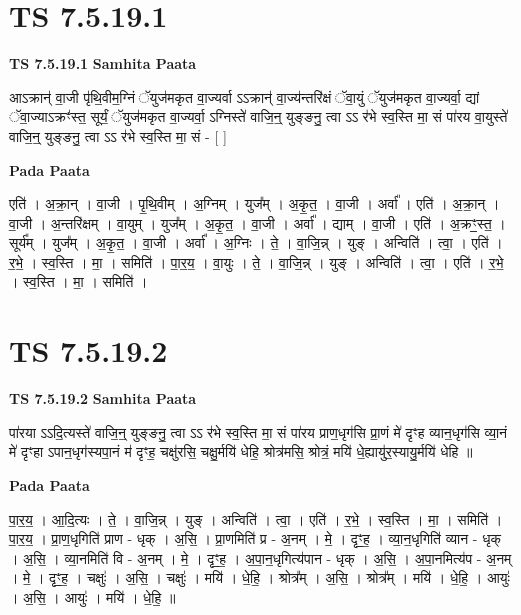 \documentclass[17pt]{extarticle}
\begin{document}
\section*{ TS 7.5.19.1 }

\textbf{TS 7.5.19.1 } \newline
\textbf{Samhita Paata} \newline

आऽक्रान्॑ वा॒जी पृ॑थि॒वीम॒ग्निं ॅयुज॑मकृत वा॒ज्यर्वा ऽऽक्रान्॑ वा॒ज्य॑न्तरि॑क्षं ॅवा॒युं ॅयुज॑मकृत वा॒ज्यर्वा॒ द्यां ॅवा॒ज्याऽक्रꣳ॑स्त॒ सूर्यं॒ ॅयुज॑मकृत वा॒ज्यर्वा॒ ऽग्निस्ते॑ वाजि॒न्॒ युङ्ङनु॒ त्वा ऽऽ र॑भे स्व॒स्ति मा॒ सं पा॑रय वा॒युस्ते॑ वाजि॒न्॒ युङ्ङनु॒ त्वा ऽऽ र॑भे स्व॒स्ति मा॒ सं - [  ] \newline

\textbf{Pada Paata} \newline

एति॑ । अ॒क्रा॒न् । वा॒जी । पृ॒थि॒वीम् । अ॒ग्निम् । युज᳚म् । अ॒कृ॒त॒ । वा॒जी । अर्वा᳚ । एति॑ । अ॒क्रा॒न् । वा॒जी । अ॒न्तरि॑क्षम् । वा॒युम् । युज᳚म् । अ॒कृ॒त॒ । वा॒जी । अर्वा᳚ । द्याम् । वा॒जी । एति॑ । अ॒क्रꣳ॒॒स्त॒ । सूर्य᳚म् । युज᳚म् । अ॒कृ॒त॒ । वा॒जी । अर्वा᳚ । अ॒ग्निः । ते॒ । वा॒जि॒न्न् । युङ् । अन्विति॑ । त्वा॒ । एति॑ । र॒भे॒ । स्व॒स्ति । मा॒ । समिति॑ । पा॒र॒य॒ । वा॒युः । ते॒ । वा॒जि॒न्न् । युङ् । अन्विति॑ । त्वा॒ । एति॑ । र॒भे॒ । स्व॒स्ति । मा॒ । समिति॑ ।  \newline




\section*{ TS 7.5.19.2 }

\textbf{TS 7.5.19.2 } \newline
\textbf{Samhita Paata} \newline

पा॑रया ऽऽदि॒त्यस्ते॑ वाजि॒न्॒ युङ्ङनु॒ त्वा ऽऽ र॑भे स्व॒स्ति मा॒ सं पा॑रय प्राण॒धृग॑सि प्रा॒णं मे॑ दृꣳह व्यान॒धृग॑सि व्या॒नं मे॑ दृꣳहा ऽपान॒धृग॑स्यपा॒नं म॑ दृꣳह॒ चक्षु॑रसि॒ चक्षु॒र्मयि॑ धेहि॒ श्रोत्र॑मसि॒ श्रोत्रं॒ मयि॑ धे॒ह्यायु॑र॒स्यायु॒र्मयि॑ धेहि ॥ \newline

\textbf{Pada Paata} \newline

पा॒र॒य॒ । आ॒दि॒त्यः । ते॒ । वा॒जि॒न्न् । युङ् । अन्विति॑ । त्वा॒ । एति॑ । र॒भे॒ । स्व॒स्ति । मा॒ । समिति॑ । पा॒र॒य॒ । प्रा॒ण॒धृगिति॑ प्राण - धृक् । अ॒सि॒ । प्रा॒णमिति॑ प्र - अ॒नम् । मे॒ । दृꣳ॒॒ह॒ । व्या॒न॒धृगिति॑ व्यान - धृक् । अ॒सि॒ । व्या॒नमिति॑ वि - अ॒नम् । मे॒ । दृꣳ॒॒ह॒ । अ॒पा॒न॒धृगित्य॑पान - धृक् । अ॒सि॒ । अ॒पा॒नमित्य॑प - अ॒नम् । मे॒ । दृꣳ॒॒ह॒ । चक्षुः॑ । अ॒सि॒ । चक्षुः॑ । मयि॑ । धे॒हि॒ । श्रोत्र᳚म् । अ॒सि॒ । श्रोत्र᳚म् । मयि॑ । धे॒हि॒ । आयुः॑ । अ॒सि॒ । आयुः॑ । मयि॑ । धे॒हि॒ ॥  \newline
\end{document}
